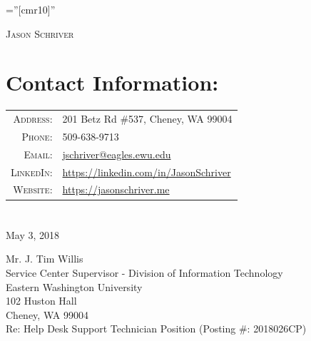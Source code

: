 \documentclass[a4paper,10pt]{article}
\begin{document}

\pagestyle{empty} %

\font\fb=''[cmr10]'' %

{\begin{center}
\textsc		{\Large Jason Schriver}
\end{center}}

\section{Contact Information:}
\begin{tabular}{rl}
    \textsc{Address:}   & 201 Betz Rd \#537, Cheney, WA 99004 \\
    \textsc{Phone:}     & 509-638-9713\\
    \textsc{Email:}     & \href{mailto:jschriver@eagles.ewu.edu}{jschriver@eagles.ewu.edu}\\
    \textsc{LinkedIn:}  & \href{https://linkedin.com/in/JasonSchriver}{https://linkedin.com/in/JasonSchriver}\\
    \textsc{Website:}   & \href{https://jasonschriver.me}{https://jasonschriver.me}
\end{tabular}
\section{}

May 3, 2018
\par

Mr. J. Tim Willis\\
Service Center Supervisor - Division of Information Technology\\
Eastern Washington University\\
102 Huston Hall\\
Cheney, WA 99004\\

Re: Help Desk Support Technician Position (Posting \#: 2018026CP)\\
\end{document}
